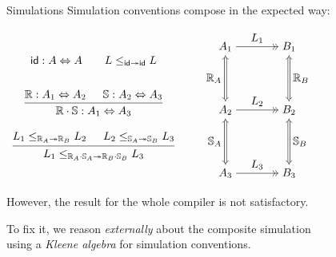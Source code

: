 \documentclass[aspectratio=141]{beamer}
\newcommand{\kw}[1]{\ensuremath{ \mathsf{#1} }}
\begin{document}
\begin{frame}{Simulations} %
  Simulation conventions compose in the expected way:

  \centering
  $\begin{array}{c}
    \kw{id} : A \Leftrightarrow A
    \qquad
    L \le_{\kw{id} \twoheadrightarrow \kw{id}} L
    \\[2em]
    {\begin{prooftree}
      \hypo{\mathbb{R} : A_1 \Leftrightarrow A_2}
      \hypo{\mathbb{S} : A_2 \Leftrightarrow A_3}
      \infer2{\mathbb{R} \cdot \mathbb{S} : A_1 \Leftrightarrow A_3}
    \end{prooftree}}
    \\[2em]
    {\begin{prooftree}
      \hypo{L_1 \le_{\mathbb{R}_A \twoheadrightarrow \mathbb{R}_B} L_2}
      \hypo{L_2 \le_{\mathbb{S}_A \twoheadrightarrow \mathbb{S}_B} L_3}
      \infer2{
        L_1 \le_{\mathbb{R}_A \cdot \mathbb{S}_A \twoheadrightarrow
                 \mathbb{R}_B \cdot \mathbb{S}_B} L_3}
    \end{prooftree}}
  \end{array}
  \qquad
  \begin{tikzpicture}[baseline,scale=1]
    \node (A1) at (-1,  2) {$A_1$};
    \node (A2) at (-1,  0) {$A_2$};
    \node (A3) at (-1, -2) {$A_3$};
    \node (B1) at ( 1,  2) {$B_1$};
    \node (B2) at ( 1,  0) {$B_2$};
    \node (B3) at ( 1, -2) {$B_3$};
    \draw (A1) edge[->>] node[auto] {$L_1$} (B1);
    \draw (A2) edge[->>] node[auto] {$L_2$} (B2);
    \draw (A3) edge[->>] node[auto] {$L_3$} (B3);
    \begin{scope}[double equal sign distance, {Implies[]}-{Implies[]}]
      \draw (A1) edge[double] node[auto,swap] {$\mathbb{R}_A$} (A2);
      \draw (B1) edge[double] node[auto] {$\mathbb{R}_B$} (B2);
      \draw (A2) edge[double] node[auto,swap] {$\mathbb{S}_A$} (A3);
      \draw (B2) edge[double] node[auto] {$\mathbb{S}_B$} (B3);
    \end{scope}
  \end{tikzpicture}
  $

  \flushleft \pause
  However, the result for the whole compiler is not satisfactory.

  To fix it, we reason \emph{externally} about the composite simulation \\
  using a \emph{Kleene algebra} for simulation conventions.
\end{frame}
\end{document}
